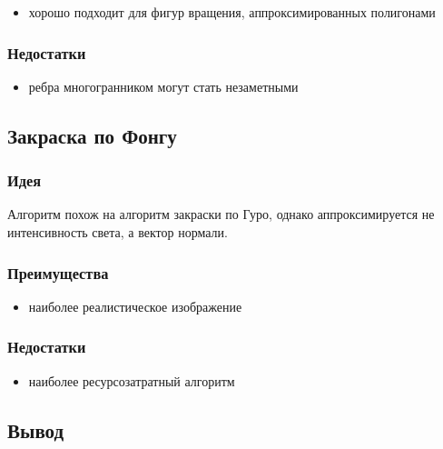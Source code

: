         \begin{itemize}
          \item хорошо подходит для фигур вращения, аппроксимированных полигонами
        \end{itemize}
      
      \subsubsection{Недостатки}
      
        \begin{itemize}
          \item ребра многогранником могут стать незаметными
        \end{itemize}
        
    \subsection{Закраска по Фонгу}
      
      \subsubsection{Идея}
      
        Алгоритм похож на алгоритм закраски по Гуро, однако аппроксимируется не интенсивность света, а вектор нормали.
      
      \subsubsection{Преимущества}
      
        \begin{itemize}
          \item наиболее реалистическое изображение
        \end{itemize}
      
      \subsubsection{Недостатки}
      
        \begin{itemize}
          \item наиболее ресурсозатратный алгоритм
        \end{itemize}
    
    \subsection{Вывод}
    
